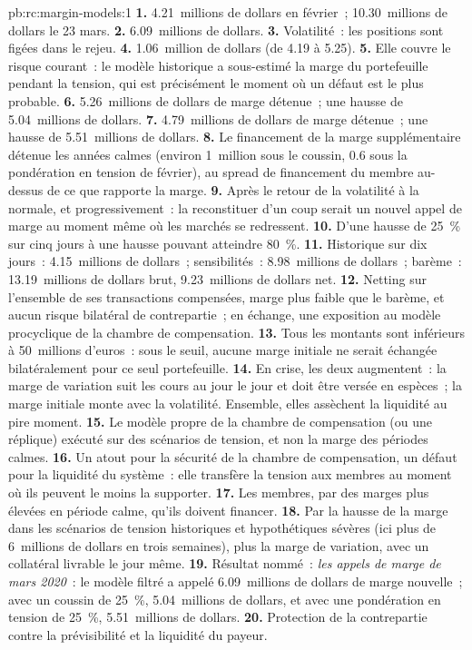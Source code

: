 \begin{solution}{pb:rc:margin-models:1}
\textbf{1.} 4.21~millions de dollars en février~; 10.30~millions de dollars le 23 mars.
\textbf{2.} 6.09~millions de dollars.
\textbf{3.} Volatilité~: les positions sont figées dans le rejeu.
\textbf{4.} 1.06~million de dollars (de 4.19 à 5.25).
\textbf{5.} Elle couvre le risque courant~: le modèle historique a sous-estimé la marge du portefeuille pendant la tension,
qui est précisément le moment où un défaut est le plus probable.
\textbf{6.} 5.26~millions de dollars de marge détenue~; une hausse de 5.04~millions de dollars.
\textbf{7.} 4.79~millions de dollars de marge détenue~; une hausse de 5.51~millions de dollars.
\textbf{8.} Le financement de la marge supplémentaire détenue les années calmes (environ 1~million sous le coussin, 0.6 sous
la pondération en tension de février), au spread de financement du membre au-dessus de ce que rapporte la marge.
\textbf{9.} Après le retour de la volatilité à la normale, et progressivement~: la reconstituer d'un coup serait un nouvel
appel de marge au moment même où les marchés se redressent.
\textbf{10.} D'une hausse de 25~\% sur cinq jours à une hausse pouvant atteindre 80~\%.
\textbf{11.} Historique sur dix jours~: 4.15~millions de dollars~; sensibilités~: 8.98~millions de dollars~; barème~: 13.19~millions de dollars
brut, 9.23~millions de dollars net.
\textbf{12.} Netting sur l'ensemble de ses transactions compensées, marge plus faible que le barème, et aucun risque bilatéral
de contrepartie~; en échange, une exposition au modèle procyclique de la chambre de compensation.
\textbf{13.} Tous les montants sont inférieurs à 50~millions d'euros~: sous le seuil, aucune marge initiale ne serait
échangée bilatéralement pour ce seul portefeuille.
\textbf{14.} En crise, les deux augmentent~: la marge de variation suit les cours au jour le jour et doit être versée en espèces~;
la marge initiale monte avec la volatilité. Ensemble, elles assèchent la liquidité au pire moment.
\textbf{15.} Le modèle propre de la chambre de compensation (ou une réplique) exécuté sur des scénarios de tension, et non la marge des périodes calmes.
\textbf{16.} Un atout pour la sécurité de la chambre de compensation, un défaut pour la liquidité du système~: elle transfère
la tension aux membres au moment où ils peuvent le moins la supporter.
\textbf{17.} Les membres, par des marges plus élevées en période calme, qu'ils doivent financer.
\textbf{18.} Par la hausse de la marge dans les scénarios de tension historiques et hypothétiques sévères (ici plus de 6~millions de dollars
en trois semaines), plus la marge de variation, avec un collatéral livrable le jour même.
\textbf{19.} Résultat nommé~: \emph{les appels de marge de mars 2020}~: le modèle filtré a appelé 6.09~millions de dollars
de marge nouvelle~; avec un coussin de 25~\%, 5.04~millions de dollars, et avec une pondération en tension de 25~\%, 5.51~millions de dollars.
\textbf{20.} Protection de la contrepartie contre la prévisibilité et la liquidité du payeur.
\end{solution}

